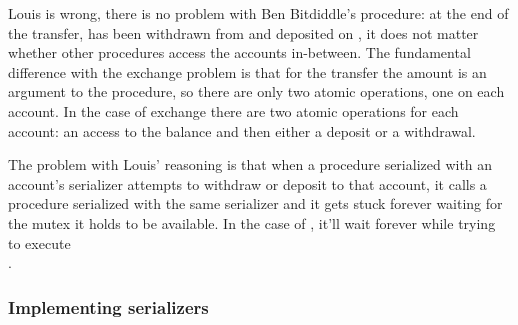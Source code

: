 \begin{exe}[3.44]
    Louis is wrong, there is no problem with Ben Bitdiddle’s procedure: at the 
    end of the transfer,  has been withdrawn from 
     and deposited on , it does not matter 
    whether other procedures access the accounts in-between. The fundamental 
    difference with the exchange problem is that for the transfer the amount is 
    an argument to the procedure, so there are only two atomic operations, one 
    on each account. In the case of exchange there are two atomic operations for 
    each account: an access to the balance and then either a deposit or 
    a withdrawal.
\end{exe}

\begin{exe}[3.45]
    The problem with Louis’ reasoning is that when a procedure serialized with 
    an account’s serializer attempts to withdraw or deposit to that account, it 
    calls a procedure serialized with the same serializer and it gets stuck 
    forever waiting for the mutex it holds to be available. In the case of 
    , it’ll wait forever while trying to execute \\
    .
\end{exe}

\subsubsection{Implementing serializers}

